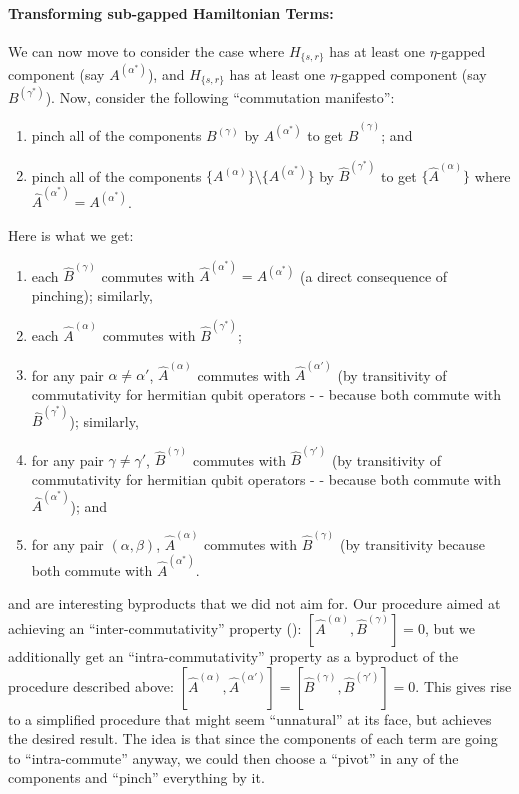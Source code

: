 \paragraph{Transforming sub-gapped Hamiltonian Terms:} We can now move to consider the case where $H_{\{s,r\}}$ has at least one $\eta$-gapped component (say $A^{(\alpha^*)}$), and $H_{\{s,r\}}$ has at least one $\eta$-gapped component (say $B^{(\gamma^*)}$). Now, consider the following ``commutation manifesto'':
\begin{enumerate}
    \item pinch all of the components $B^{(\gamma)}$ by $A^{(\alpha^*)}$ to get $\widehat{B}^{(\gamma)}$; and
    \item pinch all of the components $\{A^{(\alpha)}\}\setminus\{A^{(\alpha^*)}\}$ by $\widehat{B}^{(\gamma^*)}$ to get $\{\widehat{A}^{(\alpha)}\}$ where $\widehat{A}^{(\alpha^*)} = A^{(\alpha^*)}$.
\end{enumerate}
Here is what we get:
\begin{enumerate}
    \item each $\widehat{B}^{(\gamma)}$ commutes with $\widehat{A}^{(\alpha^*)} = A^{(\alpha^*)}$ (a direct consequence of pinching); similarly,
    \item each $\widehat{A}^{(\alpha)}$ commutes with $\widehat{B}^{(\gamma^*)}$;
    \item\label{item:intra-commutation-1} for any pair $\alpha \neq \alpha'$, $\widehat{A}^{(\alpha)}$ commutes with $\widehat{A}^{(\alpha')}$ (by transitivity of commutativity for hermitian qubit operators -  - because both commute with $\widehat{B}^{(\gamma^*)}$); similarly,
    \item\label{item:intra-commutation-2} for any pair $\gamma \neq \gamma'$, $\widehat{B}^{(\gamma)}$ commutes with $\widehat{B}^{(\gamma')}$ (by transitivity of commutativity for hermitian qubit operators -  - because both commute with $\widehat{A}^{(\alpha^*)}$); and
    \item\label{item:inter-commutation} for any pair $(\alpha, \beta)$, $\widehat{A}^{(\alpha)}$ commutes with $\widehat{B}^{(\gamma)}$ (by transitivity because both commute with $\widehat{A}^{(\alpha^*)}$.
\end{enumerate}
 and  are interesting byproducts that we did not aim for. Our procedure aimed at achieving an ``inter-commutativity'' property (): $\left[\widehat{A}^{(\alpha)}, \widehat{B}^{(\gamma)}\right] = 0$, but we additionally get an ``intra-commutativity'' property as a byproduct of the procedure described above: $\left[\widehat{A}^{(\alpha)}, \widehat{A}^{(\alpha')}\right] = \left[\widehat{B}^{(\gamma)}, \widehat{B}^{(\gamma')}\right] = 0$. This gives rise to a simplified procedure that might seem ``unnatural'' at its face, but achieves the desired result. The idea is that since the components of each term are going to ``intra-commute'' anyway, we could then choose a ``pivot'' in any of the components and ``pinch'' everything by it. 

